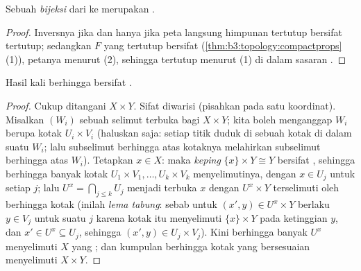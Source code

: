 \begin{corollary}\label{cor:b3:topology:compacthomeo}
Sebuah \emph{bijeksi}  dari  ke  merupakan .
\end{corollary}

\begin{proof}
Inversnya  jika dan hanya jika peta langsung himpunan tertutup bersifat
tertutup; sedangkan $F$ yang tertutup bersifat 
(\cref{thm:b3:topology:compactprops}(1)), petanya  menurut
(2), sehingga tertutup menurut (1) di dalam sasaran .
\end{proof}

\begin{theorem}\label{thm:b3:topology:tychonoff}
Hasil kali berhingga  bersifat .
\end{theorem}

\begin{proof}
Cukup ditangani $X \times Y$. Sifat  diwarisi
(pisahkan pada satu koordinat). Misalkan $(W_i)$ sebuah selimut terbuka bagi $X
\times Y$; kita boleh menganggap $W_i$ berupa kotak  $U_i \times
V_i$ (haluskan saja: setiap titik duduk di sebuah kotak di dalam suatu $W_i$;
lalu subselimut berhingga atas kotaknya melahirkan subselimut berhingga atas $W_i$). Tetapkan $x \in X$:
maka \emph{keping} $\{x\}\times Y \cong Y$ bersifat , sehingga berhingga
banyak kotak $U_1\times V_1, \dots, U_k\times V_k$ menyelimutinya, dengan
$x \in U_j$ untuk setiap $j$; lalu $U^x = \bigcap_{j \leq k} U_j$ menjadi
 terbuka $x$ dengan $U^x \times Y$ terselimuti oleh
berhingga kotak (inilah \emph{lema tabung}:
sebab untuk $(x', y) \in U^x \times Y$ berlaku $y \in V_j$
untuk suatu $j$ karena kotak itu menyelimuti $\{x\}\times Y$ pada ketinggian
$y$, dan $x' \in U^x \subseteq U_j$, sehingga $(x', y) \in U_j
\times V_j$). Kini berhingga banyak $U^x$
menyelimuti $X$ yang ; dan kumpulan berhingga kotak yang bersesuaian
menyelimuti $X \times Y$.
\end{proof}

